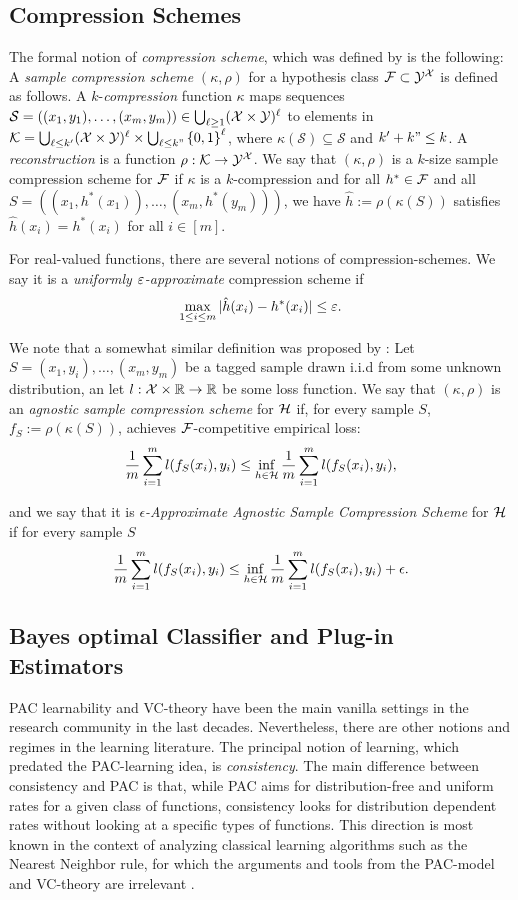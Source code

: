\documentclass[12pt,a4paper,oneside,onecolumn]{book}
\begin{document}
\subsection{Compression Schemes}

The formal notion of \emph{compression scheme}, which was defined by \citet{littlestone1986relating} is the following:
A {\em sample compression scheme} $(\kappa,\rho)$ for a hypothesis
class $\mathcal{F}\subset\mathcal{Y}^{\mathcal{X}}$
is defined as follows.
A $k$-{\em compression} function $\kappa$
maps sequences $\mathcal{S}=((x_1,y_1),\ldots,(x_m,y_m))\in\bigcup_{\ell\ge1}(\mathcal{X}\times\mathcal{Y})^\ell$
to elements in
$\mathcal{K}=\bigcup_{\ell\le k'}(\mathcal{X}\times\mathcal{Y})^\ell
\times
\bigcup_{\ell\le k"}\left\{ 0,1 \right\}^\ell$,
where $\kappa(\mathcal{S})\subseteq \mathcal{S}$ and $k'+k"\le k$.
A {\em reconstruction} is a function $\rho:\mathcal{K}\to\mathcal{Y}^{\mathcal{X}}$.
We say that $(\kappa,\rho)$ is a $k$-size sample compression
scheme for $\mathcal{F}$
if
$\kappa$ is a $k$-compression and
for all
$h^*\in\mathcal{F}$
and all
$S=((x_1,h^{*}(x_1)),\ldots,(x_m,h^{*}(y_m)))$,
we have
$\hat h:=\rho(\kappa(S))$
satisfies $\hat h(x_i)=h^*(x_i)$ for all $i\in[m]$.

For real-valued functions,
there are several notions of compression-schemes.
We say it is a \emph{uniformly $\varepsilon$-approximate} compression scheme if 
\[
\max_{1 \leq i \leq m} | \hat{h}(x_i) - h^*(x_i) | \leq \varepsilon.
\]

We note that a somewhat similar definition was proposed by \cite{david2016supervised}: 
Let $S = (x_1,y_i),\ldots,(x_m,y_m)$ be a tagged sample drawn i.i.d from some unknown distribution,
an let $l : \mathcal{X} \times \mathbb{R} \to \mathbb{R}$ be some loss function.
We say that $(\kappa,\rho)$
is an \emph{agnostic sample compression scheme} 
for $\mathcal{H}$ if,
for every sample $S$,
$f_S := \rho(\kappa(S))$,
achieves $\mathcal{F}$-competitive empirical loss:
\[ 
\frac{1}{m}\sum_{i=1}^{m} l(f_S (x_i), y_i) \leq 
\inf_{h\in\mathcal{H}} \frac{1}{m}\sum_{i=1}^{m} l(f_S (x_i), y_i),
\] 

and we say that it is 
\emph{$\epsilon$-Approximate Agnostic Sample Compression Scheme} for $\mathcal{H}$
if for every sample $S$
\[ 
\frac{1}{m}\sum_{i=1}^{m} l(f_S (x_i), y_i) \leq 
\inf_{h\in\mathcal{H}} \frac{1}{m}\sum_{i=1}^{m} l(f_S (x_i), y_i) + \epsilon.
\] 

\subsection{Bayes optimal Classifier and Plug-in Estimators}

PAC learnability and VC-theory have been the main vanilla settings in the research community in the last decades. Nevertheless, there are other notions and regimes in the learning literature. 
The principal notion of learning, which predated the PAC-learning idea, is \emph{consistency}. The main difference between consistency and PAC is that, while PAC aims for distribution-free and uniform rates for a given class of functions, consistency looks for distribution dependent rates without looking at a specific types of functions.
This direction is most known in the context of analyzing classical learning algorithms such as the Nearest Neighbor rule, for which the arguments and tools from the PAC-model and VC-theory are irrelevant  \citep{devroye1985nonparametric, 1053964, DBLP:journals/corr/GottliebKK13}.
\end{document}
